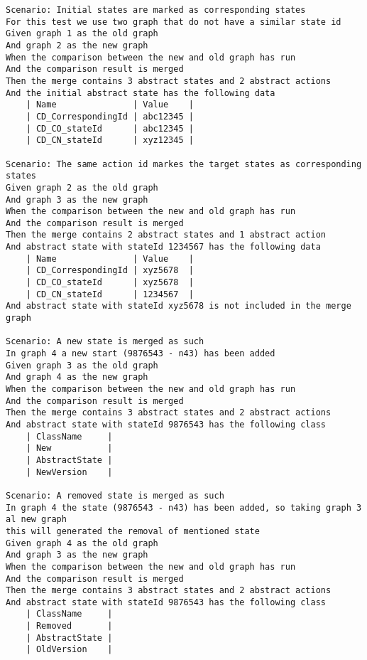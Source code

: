 \begin{lstlisting}[language=Gherkin,  basicstyle=\tiny, caption=Test Scenario's, label=code:gherkin-tests]
Scenario: Initial states are marked as corresponding states
For this test we use two graph that do not have a similar state id 
Given graph 1 as the old graph
And graph 2 as the new graph
When the comparison between the new and old graph has run
And the comparison result is merged
Then the merge contains 3 abstract states and 2 abstract actions
And the initial abstract state has the following data
    | Name               | Value    |
    | CD_CorrespondingId | abc12345 |
    | CD_CO_stateId      | abc12345 |
    | CD_CN_stateId      | xyz12345 |

Scenario: The same action id markes the target states as corresponding states
Given graph 2 as the old graph
And graph 3 as the new graph
When the comparison between the new and old graph has run
And the comparison result is merged
Then the merge contains 2 abstract states and 1 abstract action
And abstract state with stateId 1234567 has the following data
    | Name               | Value    |
    | CD_CorrespondingId | xyz5678  |
    | CD_CO_stateId      | xyz5678  |
    | CD_CN_stateId      | 1234567  |
And abstract state with stateId xyz5678 is not included in the merge graph

Scenario: A new state is merged as such
In graph 4 a new start (9876543 - n43) has been added
Given graph 3 as the old graph
And graph 4 as the new graph
When the comparison between the new and old graph has run
And the comparison result is merged
Then the merge contains 3 abstract states and 2 abstract actions
And abstract state with stateId 9876543 has the following class
    | ClassName     |
    | New           |
    | AbstractState |
    | NewVersion    |

Scenario: A removed state is merged as such
In graph 4 the state (9876543 - n43) has been added, so taking graph 3 al new graph
this will generated the removal of mentioned state
Given graph 4 as the old graph
And graph 3 as the new graph
When the comparison between the new and old graph has run
And the comparison result is merged
Then the merge contains 3 abstract states and 2 abstract actions
And abstract state with stateId 9876543 has the following class
    | ClassName     |
    | Removed       |
    | AbstractState |
    | OldVersion    |


\end{lstlisting}
